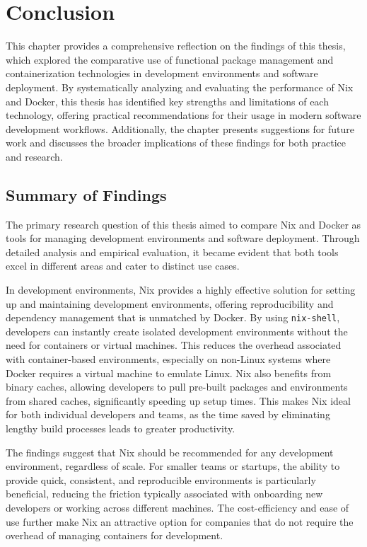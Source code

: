 \chapter{Conclusion}
This chapter provides a comprehensive reflection on the findings of this thesis, which
explored the comparative use of functional package management and containerization
technologies in development environments and software deployment. By systematically
analyzing and evaluating the performance of Nix and Docker, this thesis has identified
key strengths and limitations of each technology, offering practical recommendations for
their usage in modern software development workflows. Additionally, the chapter presents
suggestions for future work and discusses the broader implications of these findings
for both practice and research.

\section{Summary of Findings}
The primary research question of this thesis aimed to compare Nix and Docker as tools
for managing development environments and software deployment. Through detailed
analysis and empirical evaluation, it became evident that both tools excel in different
areas and cater to distinct use cases.

In development environments, Nix provides a highly effective solution for setting up
and maintaining development environments, offering reproducibility and dependency
management that is unmatched by Docker. By using \texttt{nix-shell}, developers can
instantly create isolated development environments without the need for containers or
virtual machines. This reduces the overhead associated with container-based environments,
especially on non-Linux systems where Docker requires a virtual machine to emulate
Linux. Nix also benefits from binary caches, allowing developers to pull pre-built
packages and environments from shared caches, significantly speeding up setup times.
This makes Nix ideal for both individual developers and teams, as the time saved by
eliminating lengthy build processes leads to greater productivity.

The findings suggest that Nix should be recommended for any development environment,
regardless of scale. For smaller teams or startups, the ability to provide quick, consistent,
and reproducible environments is particularly beneficial, reducing the friction typically
associated with onboarding new developers or working across different machines. The
cost-efficiency and ease of use further make Nix an attractive option for companies that
do not require the overhead of managing containers for development.

